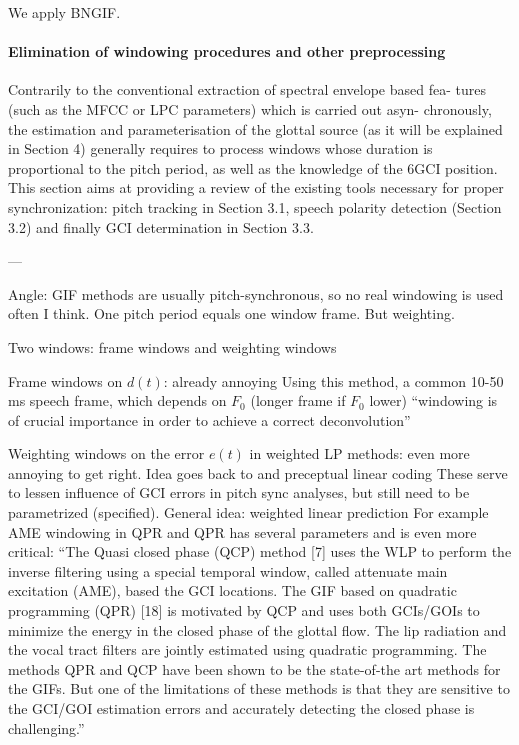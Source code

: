 \begin{chaptersections}{%
We apply BNGIF.
}
\paragraph{Elimination of windowing procedures and other preprocessing}

Contrarily to the conventional extraction of spectral envelope based fea-
tures (such as the MFCC or LPC parameters) which is carried out asyn-
chronously,
the estimation and parameterisation of the glottal source (as it
will be explained in Section 4) generally requires to process windows whose
duration is proportional to the pitch period, as well as the knowledge of the
6GCI position. This section aims at providing a review of the existing tools
necessary for proper synchronization: pitch tracking in Section 3.1, speech
polarity detection (Section 3.2) and finally GCI determination in Section 3.3.

---

Angle: GIF methods are usually pitch-synchronous, so no real windowing is used often I think.
One pitch period equals one window frame.
But weighting.

Two windows: frame windows and weighting windows

Frame windows on $d(t)$: already annoying
Using this method, a common 10-50 ms speech frame, which depends on $F_0$ (longer frame if $F_0$ lower) \citep{Airaksinen2014}
``windowing is of crucial importance in order to achieve a correct deconvolution'' \citep{Drugman2011}

Weighting windows on the error $e(t)$ in weighted LP methods: even more annoying to get right.
Idea goes back to \citep{Pinson1963} and preceptual linear coding \citep{Schroeder1999}
These serve to lessen influence of GCI errors in pitch sync analyses, but still need to be parametrized (specified).
General idea: weighted linear prediction \citep{Ma1993}
For example
AME windowing in QPR and QPR has several parameters and is even more critical:
``The Quasi closed phase (QCP) method [7] uses the WLP to perform the inverse filtering using a special temporal window, called attenuate main excitation (AME), based the GCI locations. The GIF based on quadratic programming (QPR) [18] is motivated by QCP and uses both GCIs/GOIs to minimize the energy in the closed phase of the glottal flow. The lip radiation and the vocal tract filters are jointly estimated using quadratic programming. The methods QPR and QCP have been shown to be the state-of-the art methods for the GIFs. But one of the limitations of these methods is that they are sensitive to the GCI/GOI estimation errors and accurately detecting the closed phase is challenging.'' \citep{Rao2018}


\end{chaptersections}
